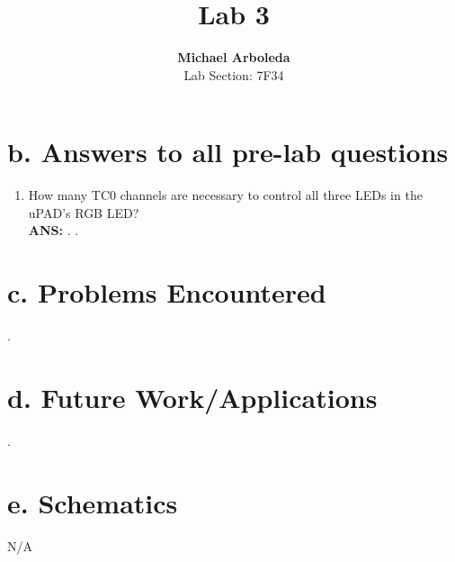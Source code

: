 \documentclass[11pt]{article}
\theoremstyle{plain}
\theoremstyle{definition}
\begin{document}
\captionsetup[figure]{labelfont=bf} 

\title{Lab 3}
\author{\textbf{Michael Arboleda}\\Lab Section: 7F34}
\maketitle
%
%
\section*{b. Answers to all pre-lab questions}
\begin{enumerate}[label={\arabic*)},font={\color{red}\bfseries}]
	\item How many TC0 channels are necessary to control all three LEDs in the uPAD’s RGB LED?
	\\[0.8ex]
	\textbf{ANS:} .
	.
\end{enumerate}
%
%
\section*{c. Problems Encountered}
.
%
%
\section*{d. Future Work/Applications}
.
%
%
\section*{e. Schematics}
N/A
%
%
\newpage
\end{document}
